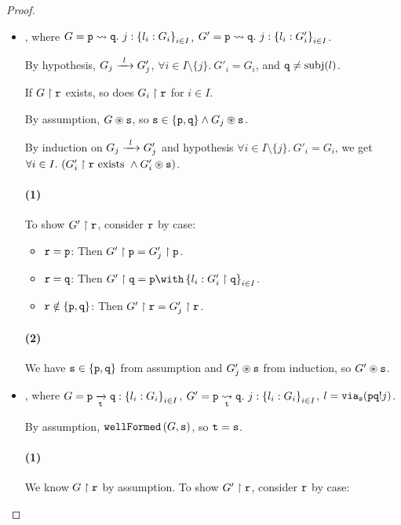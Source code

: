\begin{proof}
\begin{itemize}
\item {},
where
$G = \gtrans{p}{q}{j}{l_i: G_i}{i \in I}$,
$G' = \gtrans{p}{q}{j}{l_i: G'_i}{i \in I}$.

By hypothesis,
$\treduce{G_j}{G'_j}{l}$,
$\forall i \in I \setminus \{ j \}. ~ G'_i = G_i$,
and $\mrole{q} \neq \subj{l}$.

If $\proj{G}{r}$ exists, so does $\proj{G_i}{r}$ for $i \in I$.

By assumption, $\centroid{G}{s}$, 
so $\mrole{s} \in \{ \mrole{p}, \mrole{q} \} \wedge 
\centroid{G_j}{s}$.

By induction on $\treduce{G_j}{G'_j}{l}$
and hypothesis $\forall i \in I \setminus \{ j \}. ~ G'_i = G_i$,
we get
$\forall i \in I. ~ 
(\proj{G'_i}{r} \text{ exists } \wedge
\centroid{G'_i}{s})$.

\paragraph{(1)}
To show $\proj{G'}{r}$, consider $\mrole{r}$ by case:

\begin{itemize}
\item $\mrole{r} = \mrole{p}$:
Then $\proj{G'}{p} = \proj{G'_j}{p}$.

\item $\mrole{r} = \mrole{q}$:
Then $\proj{G'}{q} = \tbra{p}{l_i: \proj{G'_i}{q}}{i \in I}$.

\item $\mrole{r} \notin \{ \mrole{p}, \mrole{q} \}$:
Then $\proj{G'}{r} = \proj{G'_j}{r}$.

\end{itemize}

\paragraph{(2)}
We have $\mrole{s} \in \{ \mrole{p}, \mrole{q} \}$
from assumption and
$\centroid{G'_j}{s}$ from induction, so $\centroid{G'}{s}$.

\item {},
where
$G = \groute{p}{q}{t}{l_i: G_i}{i \in I}$,
$G' = \gtransroute{p}{q}{t}{j}{l_i: G_i}{i \in I}$,
$l = \via{s}{\aout{p}{q}{j}}$.

By assumption, $\wfnew{G}{s}$, so $\mrole{t} = \mrole{s}$.

\paragraph{(1)}
We know $\proj{G}{r}$ by assumption.
To show $\proj{G'}{r}$, consider $\mrole{r}$ by case:


\end{itemize}
\end{proof}
